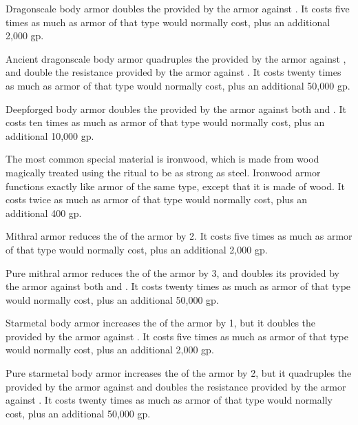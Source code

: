          Dragonscale body armor doubles the  provided by the armor against .
        It costs five times as much as armor of that type would normally cost, plus an additional 2,000 gp.

         Ancient dragonscale body armor quadruples the  provided by the armor against , and double the resistance provided by the armor against .
        It costs twenty times as much as armor of that type would normally cost, plus an additional 50,000 gp.

         Deepforged body armor doubles the  provided by the armor against both  and .
        It costs ten times as much as armor of that type would normally cost, plus an additional 10,000 gp.

         The most common special material is ironwood, which is made from wood magically treated using the  ritual to be as strong as steel. Ironwood armor functions exactly like  armor of the same type, except that it is made of wood.
        It costs twice as much as armor of that type would normally cost, plus an additional 400 gp.

         Mithral armor reduces the  of the armor by 2.
        It costs five times as much as armor of that type would normally cost, plus an additional 2,000 gp.

         Pure mithral armor reduces the  of the armor by 3, and doubles its  provided by the armor against both  and .
        It costs twenty times as much as armor of that type would normally cost, plus an additional 50,000 gp.

         Starmetal body armor increases the  of the armor by 1, but it doubles the  provided by the armor against .
        It costs five times as much as armor of that type would normally cost, plus an additional 2,000 gp.

         Pure starmetal body armor increases the  of the armor by 2, but it quadruples the  provided by the armor against  and doubles the resistance provided by the armor against .
        It costs twenty times as much as armor of that type would normally cost, plus an additional 50,000 gp.

